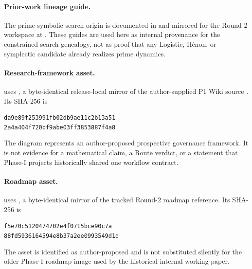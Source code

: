 \paragraph{Prior-work lineage guide.}
The prime-symbolic search origin is documented in
 and mirrored for the Round-2
workspace at .
These guides are used here as internal provenance for the constrained search
genealogy, not as proof that any Logistic, H\'{e}non, or symplectic candidate
already realizes prime dynamics.

\paragraph{Research-framework asset.}
 uses , a
byte-identical release-local mirror of the author-supplied P1 Wiki source
. Its SHA-256 is
\begin{center}\footnotesize
\texttt{da9e89f253991fb02db9ae11c2b13a51}\\[-.2ex]
\texttt{2a4a404f720bf9abe03ff3853887f4a8}
\end{center}
The diagram represents an author-proposed prospective governance framework.
It is not evidence for a mathematical claim, a Route verdict, or a statement
that Phase-I projects historically shared one workflow contract.

\paragraph{Roadmap asset.}
 uses , a byte-identical
mirror of the tracked Round-2 roadmap reference. Its SHA-256 is
\begin{center}\footnotesize
\texttt{f5e70c5120474702e4f0715bce90c7a}\\[-.2ex]
\texttt{88fd5936164594e8b37a2ee0993549d1d}
\end{center}
The asset is identified as author-proposed and is not substituted silently for
the older Phase-I roadmap image used by the historical internal working paper.

